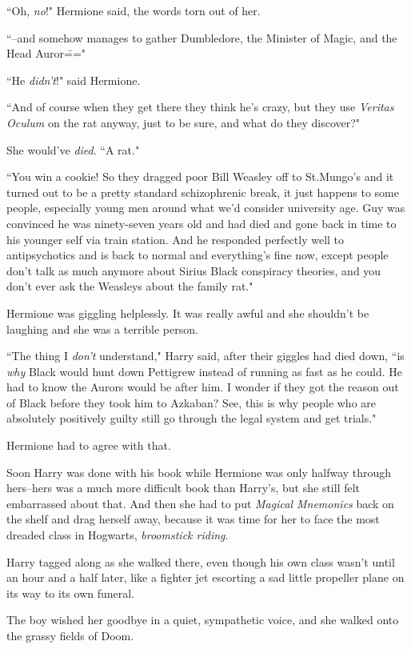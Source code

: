 ``Oh, \emph{no}!" Hermione said, the words torn out of her.

``\---and somehow manages to gather Dumbledore, the Minister of Magic, and the Head Auror\==="

``He \emph{didn't}!" said Hermione.

``And of course when they get there they think he's crazy, but they use \emph{Veritas Oculum} on the rat anyway, just to be sure, and what do they discover?"

She would've \emph{died}. ``A rat."

``You win a cookie! So they dragged poor Bill Weasley off to St.\?Mungo's and it turned out to be a pretty standard schizophrenic break, it just happens to some people, especially young men around what we'd consider university age. Guy was convinced he was ninety-seven years old and had died and gone back in time to his younger self via train station. And he responded perfectly well to antipsychotics and is back to normal and everything's fine now, except people don't talk as much anymore about Sirius Black conspiracy theories, and you don't ever ask the Weasleys about the family rat."

Hermione was giggling helplessly. It was really awful and she shouldn't be laughing and she was a terrible person.

``The thing I \emph{don't} understand," Harry said, after their giggles had died down, ``is \emph{why} Black would hunt down Pettigrew instead of running as fast as he could. He had to know the Aurors would be after him. I wonder if they got the reason out of Black before they took him to Azkaban? See, this is why people who are absolutely positively guilty still go through the legal system and get trials."

Hermione had to agree with that.

Soon Harry was done with his book while Hermione was only halfway through hers\---hers was a much more difficult book than Harry's, but she still felt embarrassed about that. And then she had to put \emph{Magical Mnemonics} back on the shelf and drag herself away, because it was time for her to face the most dreaded class in Hogwarts, \emph{broomstick riding}.

Harry tagged along as she walked there, even though his own class wasn't until an hour and a half later, like a fighter jet escorting a sad little propeller plane on its way to its own funeral.

The boy wished her goodbye in a quiet, sympathetic voice, and she walked onto the grassy fields of Doom.

